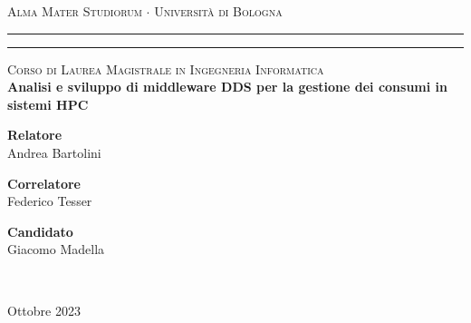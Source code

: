 
\begin{titlepage}
	\begin{center}
		{{\Large{\textsc{Alma Mater Studiorum $\cdot$ Universit\`a di
		Bologna}}}} \rule[0.1cm]{14cm}{0.1mm}
		\rule[0.5cm]{14cm}{0.6mm}
			\large{\textsc{Corso di Laurea Magistrale in Ingegneria Informatica}}
			\\[1.8cm]
			\LARGE
			{\bfseries Analisi e sviluppo di middleware DDS per la gestione dei consumi in sistemi HPC}\\[1.2cm]
	\end{center}
	\vspace{3.0cm}
	\vfill
	\begin{minipage}{0.39\textwidth}
		{\bfseries Relatore}\\
		Andrea Bartolini

		{\bfseries Correlatore}\\
		Federico Tesser  
	\end{minipage}
	\hfill
	\vspace{2cm}
	\begin{minipage}{0.39\textwidth}
		\begin{flushright} {\bfseries Candidato}\\
		Giacomo Madella \end{flushright} 
	\end{minipage} \\
\begin{center}
	Ottobre 2023
\end{center}

\end{titlepage}




